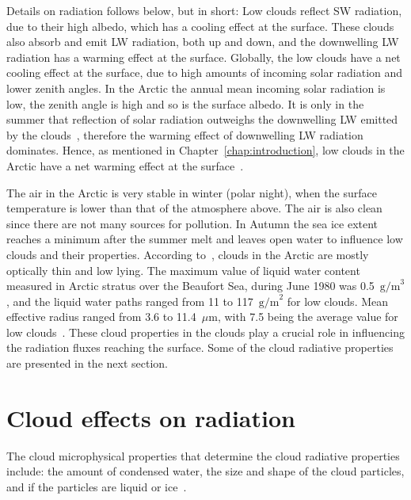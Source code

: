 Details on radiation follows below, but in short: Low clouds reflect SW radiation, due to their high albedo, which has a cooling effect at the surface. These clouds also absorb and emit LW radiation, both up and down, and the downwelling LW radiation has a warming effect at the surface. Globally, the low clouds have a net cooling effect at the surface, due to high amounts of incoming solar radiation and lower zenith angles. In the Arctic the annual mean incoming solar radiation is low, the zenith angle is high and so is the surface albedo. It is only in the summer that reflection of solar radiation outweighs the downwelling LW emitted by the clouds~\citep{Curry1996}, therefore the warming effect of downwelling LW radiation dominates. Hence, as mentioned in Chapter~\ref{chap:introduction}, low clouds in the Arctic have a net warming effect at the surface~\citep{Shupe2004}.

The air in the Arctic is very stable in winter (polar night), when the surface temperature is lower than that of the atmosphere above. The air is also clean since there are not many sources for pollution. In Autumn the sea ice extent reaches a minimum after the summer melt and leaves open water to influence low clouds and their properties. According to~\citet{Curry1996}, clouds in the Arctic are mostly optically thin and low lying. The maximum value of liquid water content measured in Arctic stratus over the Beaufort Sea, during June 1980 was 0.5~$\text{g/m}^3$, and the liquid water paths ranged from 11 to 117~$\text{g/m}^2$ for low clouds. Mean effective radius ranged from 3.6 to 11.4~$\mu\text{m}$, with 7.5 being the average value for low clouds~\citep{Curry1996}. These cloud properties in the clouds play a crucial role in influencing the radiation fluxes reaching the surface. Some of the cloud radiative properties are presented in the next section.

\section{Cloud effects on radiation}
The cloud microphysical properties that determine the cloud radiative properties include: the amount of condensed water, the size and shape of the cloud particles, and if the particles are liquid or ice~\citep{Curry1996}.

